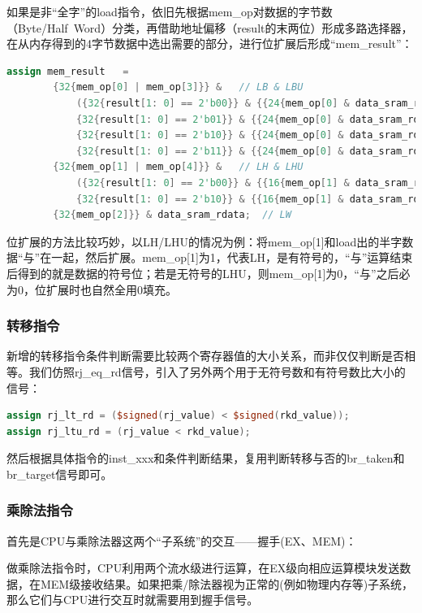 \documentclass[11pt]{article}
\begin{document}
如果是非“全字”的load指令，依旧先根据mem_op对数据的字节数（Byte/Half\ Word）分类，再借助地址偏移（result的末两位）形成多路选择器，在从内存得到的4字节数据中选出需要的部分，进行位扩展后形成“mem_result”：

\begin{lstlisting}[language=Verilog, caption={load数据}]
assign mem_result   = 
        {32{mem_op[0] | mem_op[3]}} &   // LB & LBU
            ({32{result[1: 0] == 2'b00}} & {{24{mem_op[0] & data_sram_rdata[7]}}, data_sram_rdata[7: 0]} | 
    		{32{result[1: 0] == 2'b01}} & {{24{mem_op[0] & data_sram_rdata[15]}}, data_sram_rdata[15: 8]} | 
			{32{result[1: 0] == 2'b10}} & {{24{mem_op[0] & data_sram_rdata[23]}}, data_sram_rdata[23: 16]} | 
			{32{result[1: 0] == 2'b11}} & {{24{mem_op[0] & data_sram_rdata[31]}}, data_sram_rdata[31: 24]}) |
		{32{mem_op[1] | mem_op[4]}} &   // LH & LHU
			({32{result[1: 0] == 2'b00}} & {{16{mem_op[1] & data_sram_rdata[15]}}, data_sram_rdata[15: 0]} |
			{32{result[1: 0] == 2'b10}} & {{16{mem_op[1] & data_sram_rdata[31]}}, data_sram_rdata[31: 16]}) |
	 	{32{mem_op[2]}} & data_sram_rdata;  // LW
\end{lstlisting}

位扩展的方法比较巧妙，以LH/LHU的情况为例：将mem_op[1]和load出的半字数据“与”在一起，然后扩展。mem_op[1]为1，代表LH，是有符号的，“与”运算结束后得到的就是数据的符号位；若是无符号的LHU，则mem_op[1]为0，“与”之后必为0，位扩展时也自然全用0填充。

\subsubsection{转移指令}
新增的转移指令条件判断需要比较两个寄存器值的大小关系，而非仅仅判断是否相等。我们仿照rj_eq_rd信号，引入了另外两个用于无符号数和有符号数比大小的信号：

\begin{lstlisting}[language=Verilog, caption={转移指令条件判断信号}]
assign rj_lt_rd = ($signed(rj_value) < $signed(rkd_value));
assign rj_ltu_rd = (rj_value < rkd_value);
\end{lstlisting}

然后根据具体指令的inst_xxx和条件判断结果，复用判断转移与否的br_taken和br_target信号即可。

\subsubsection{乘除法指令}
首先是CPU与乘除法器这两个“子系统”的交互——握手(EX、MEM)：

做乘除法指令时，CPU利用两个流水级进行运算，在EX级向相应运算模块发送数据，在MEM级接收结果。如果把乘/除法器视为正常的(例如物理内存等)子系统，那么它们与CPU进行交互时就需要用到握手信号。
\end{document}
